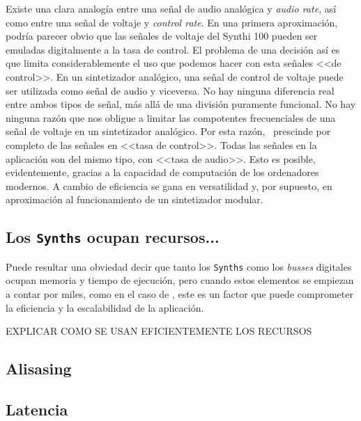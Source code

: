 Existe una clara analogía entre una señal de audio analógica y \textit{audio rate}, así como entre una señal de voltaje y \textit{control rate}. En una primera aproximación, podría parecer obvio que las señales de voltaje del Synthi 100 pueden ser emuladas digitalmente a la tasa de control. El problema de una decisión así es que limita considerablemente el uso que podemos hacer con esta señales <<de control>>. En un sintetizador analógico, una señal de control de voltaje puede ser utilizada como señal de audio y viceversa. No hay ninguna diferencia real entre ambos tipos de señal, más allá de una división puramente funcional. No hay ninguna razón que nos obligue a limitar las compotentes frecuenciales de una señal de voltaje en un sintetizador analógico. Por esta razón, \appName\ prescinde por completo de las señales en <<tasa de control>>. Todas las señales en la aplicación son del mismo tipo, con <<tasa de audio>>. Esto es posible, evidentemente, gracias a la capacidad de computación de los ordenadores modernos. A cambio de eficiencia se gana en versatilidad y, por supuesto, en aproximación al funcionamiento de un sintetizador modular.


\subsection{Los \texttt{Synths} ocupan recursos...}
Puede resultar una obviedad decir que tanto los \texttt{Synths} como los \textit{busses} digitales ocupan memoria y tiempo de ejecución, pero cuando estos elementos se empiezan a contar por miles, como en el caso de \appName, este es un factor que puede comprometer la eficiencia y la escalabilidad de la aplicación.

EXPLICAR COMO SE USAN EFICIENTEMENTE LOS RECURSOS


\subsection{Alisasing}

\subsection{Latencia}



